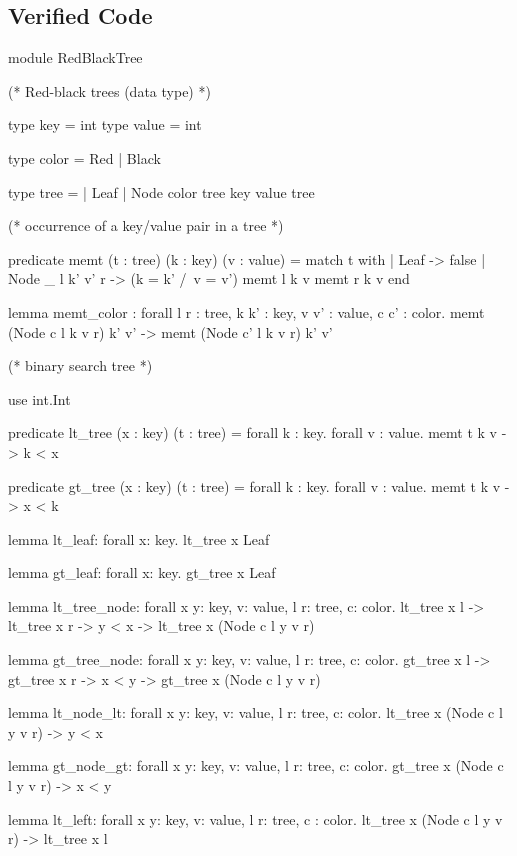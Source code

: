 \subsection{Verified \whyml Code}
\label{subsec:Red_Black_Trees_Whyml_Og}

\begin{whylang}
module RedBlackTree

  (* Red-black trees (data type) *)

  type key = int
  type value = int

  type color = Red | Black

  type tree =
    | Leaf
    | Node color tree key value tree

  (* occurrence of a key/value pair in a tree *)

  predicate memt (t : tree) (k : key) (v : value) =
    match t with
    | Leaf -> false
    | Node _ l k' v' r -> (k = k' /\ v = v') \/ memt l k v \/ memt r k v
    end

  lemma memt_color :
    forall l r : tree, k k' : key, v v' : value, c c' : color.
    memt (Node c l k v r) k' v' -> memt (Node c' l k v r) k' v'

  (* binary search tree *)

  use int.Int

  predicate lt_tree (x : key) (t : tree) =
    forall k : key. forall v : value. memt t k v -> k < x

  predicate gt_tree (x : key) (t : tree) =
    forall k : key. forall v : value. memt t k v -> x < k

  lemma lt_leaf: forall x: key. lt_tree x Leaf

  lemma gt_leaf: forall x: key. gt_tree x Leaf

  lemma lt_tree_node:
    forall x y: key, v: value, l r: tree, c: color.
    lt_tree x l -> lt_tree x r -> y < x -> lt_tree x (Node c l y v r)

  lemma gt_tree_node:
    forall x y: key, v: value, l r: tree, c: color.
    gt_tree x l -> gt_tree x r -> x < y -> gt_tree x (Node c l y v r)

  lemma lt_node_lt:
    forall x y: key, v: value, l r: tree, c: color.
    lt_tree x (Node c l y v r) -> y < x

  lemma gt_node_gt:
    forall x y: key, v: value, l r: tree, c: color.
    gt_tree x (Node c l y v r) -> x < y

  lemma lt_left:
    forall x y: key, v: value, l r: tree, c : color.
    lt_tree x (Node c l y v r) -> lt_tree x l


\end{whylang}

